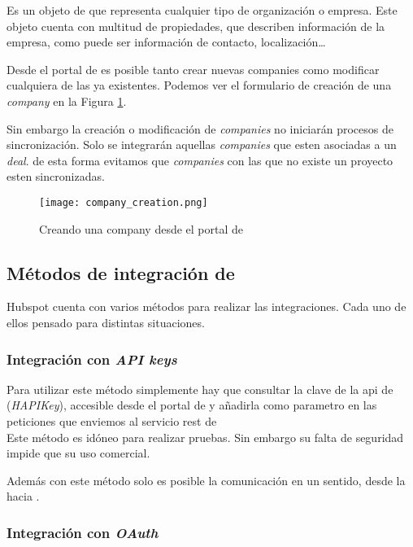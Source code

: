 		Es un objeto de \hs{} que representa cualquier tipo de organización o empresa. 
		Este objeto cuenta con multitud de propiedades, que describen información de la empresa, como puede ser información de contacto, localización\ldots 
		
		Desde el portal de \hs{} es posible tanto crear nuevas companies como modificar cualquiera de las ya existentes. Podemos ver el formulario de creación de una \textit{company} en la Figura \ref{fig:company_creation}.
		
		Sin embargo la creación o modificación de \textit{companies} no iniciarán procesos de sincronización. Solo se integrarán aquellas \textit{companies} que esten asociadas a un \textit{deal}.
		de esta forma evitamos que \textit{companies} con las que no existe un proyecto esten sincronizadas.
		
		\begin{figure}
			\centering
			\texttt{[image: company\_creation.png]}
			\caption{Creando una company desde el portal de \hs{}}
			\label{fig:company_creation}
		\end{figure}


\subsection{Métodos de integración de \hs{}}
Hubspot cuenta con varios métodos para realizar las integraciones. Cada uno de ellos pensado para distintas situaciones.

\subsubsection{Integración con \textit{API keys}}

Para utilizar este método simplemente hay que consultar la clave de la \acrshort{api} de \hs{} (\textit{HAPIKey}), 
accesible desde el portal de \hs{} y añadirla como parametro en las peticiones que enviemos al servicio \acrshort{rest} de \hs{}\\

Este método es idóneo para realizar pruebas. Sin embargo su falta de seguridad impide que su uso comercial. %

Además con este método solo es posible la comunicación en un sentido, desde la \iface{} hacia \hs{}.

\subsubsection{Integración con \textit{OAuth}}
\label{subsec:app_hs}

